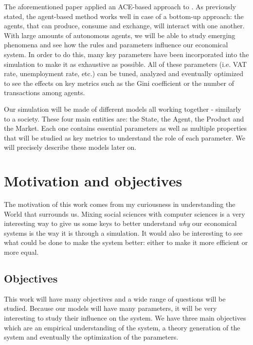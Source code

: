The aforementioned paper applied an ACE-based approach to . As previously stated, the agent-based method works well in case of a bottom-up approach: the agents, that can  produce, consume and exchange, will interact with one another. With large amounts of autonomous agents, we will be able to study emerging phenomena and see how the rules and parameters influence our economical system. In order to do this, many key parameters have been incorporated into the simulation to make it as exhaustive as possible. All of these parameters (i.e. VAT rate, unemployment rate, etc.) can be tuned, analyzed and eventually optimized to see the effects on key metrics such as the Gini coefficient or the number of transactions among agents. 

Our simulation will be made of different models all working together - similarly to a society. These four main entities are: the State, the Agent, the Product and the Market. Each one contains essential parameters as well as multiple properties that will be studied as key metrics to understand the role of each parameter. We will precisely describe these models later on.


\section{Motivation and objectives}\label{section:motivation_objectives}

The motivation of this work comes from my curiousness in understanding the World that surrounds us. Mixing social sciences with computer sciences is a very interesting way to give us some keys to better understand \emph{why} our economical systems is the way it is through a simulation. It would also be interesting to see what could be done to make the system better: either to make it more efficient or more equal.

\subsection{Objectives}

This work will have many objectives and a wide range of questions will be studied. Because our models will have many parameters, it will be very interesting to study their influence on the system. We have three main objectives which are an empirical understanding of the system, a theory generation of the system \cite{tesfatsion_handbook} and eventually the optimization of the parameters.

